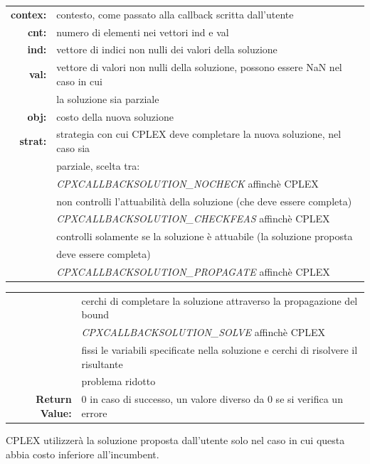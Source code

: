\begin{table}[h]
\centering
\begin{tabular}{rl}
\textbf{contex:} & {contesto, come passato alla callback scritta dall'utente}\\
\textbf{cnt:} & {numero di elementi nei vettori ind e val}\\
\textbf{ind:} & {vettore di indici non nulli dei valori della soluzione}\\
\textbf{val:} & {vettore di valori non nulli della soluzione, possono essere NaN nel caso in cui }\\
&{la soluzione sia parziale}\\
\textbf{obj:} & {costo della nuova soluzione}\\
\textbf{strat:} & {strategia con cui CPLEX deve completare la nuova soluzione, nel caso sia }\\
&{parziale, scelta tra:}\\
&{\textit{CPXCALLBACKSOLUTION\_NOCHECK} affinchè CPLEX}\\ 
&{non controlli l'attuabilità della soluzione (che deve essere completa) }\\
&{\textit{CPXCALLBACKSOLUTION\_CHECKFEAS} affinchè CPLEX}\\
&{controlli solamente se la soluzione è attuabile (la soluzione proposta }\\
&{deve essere completa)}\\
&{\textit{CPXCALLBACKSOLUTION\_PROPAGATE} affinchè CPLEX }\\
\end{tabular}
\end{table}
\begin{table}[h]
\centering
\begin{tabular}{rl}
&{cerchi di completare la soluzione attraverso la propagazione del bound}\\
&{\textit{CPXCALLBACKSOLUTION\_SOLVE} affinchè CPLEX}\\ 
&{fissi le variabili specificate nella soluzione e cerchi di risolvere il risultante }\\
&{problema ridotto}\\
\textbf{Return Value:} & {0 in caso di successo, un valore diverso da 0 se si verifica un errore}\\
\end{tabular}
\end{table}
CPLEX utilizzerà la soluzione proposta dall'utente solo nel caso in cui questa abbia costo inferiore all'incumbent.
